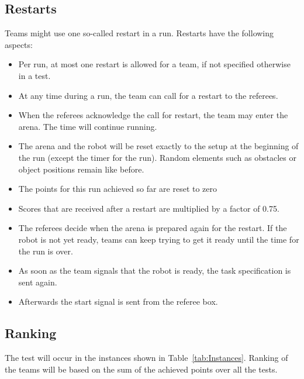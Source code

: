 \subsection{Restarts}
Teams might use one so-called restart in a run. Restarts have the following aspects:

\begin{itemize}

	\item Per run, at most one restart is allowed for a team, if not specified otherwise in a test.
	\item At any time during a run, the team can call for a restart to the referees.
	\item When the referees acknowledge the call for restart, the team may enter the arena. The time will continue running.
	\item The arena and the robot will be reset exactly to the setup at the beginning of the run (except the timer for the run). Random elements such as obstacles or object positions remain like before.
	\item The points for this run achieved so far are reset to zero 
	\item Scores that are received after a restart are multiplied by a factor of 0.75.
	\item The referees decide when the arena is prepared again for the restart. If 	the robot is not yet ready, teams can keep trying to get it ready until the time for the run is over.
	\item As soon as the team signals that the robot is ready, the task specification is sent again.
	\item Afterwards the start signal is sent from the referee box.

\end{itemize}


\subsection{Ranking}

The test will occur in the instances shown in Table~\ref{tab:Instances}. Ranking of the teams will be based on the sum of the achieved points over all the tests.

\renewcommand{\arraystretch}{1.1}
\newcommand{\R}[2]{
	\begin{turn}{90}
		\begin{minipage}[][1em][c]{#2}
		#1
	  \end{minipage}
	\end{turn}
}

